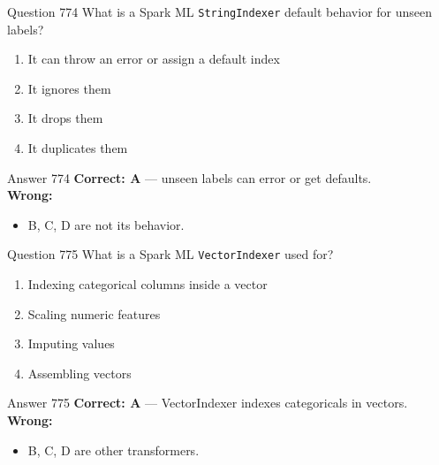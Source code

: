 \documentclass[aspectratio=169,11pt]{beamer}
\begin{document}
	\begin{frame}{Question 774}
		What is a Spark ML \texttt{StringIndexer} default behavior for unseen labels?
		\begin{enumerate}[label=\Alph*.]
			\item It can throw an error or assign a default index
			\item It ignores them
			\item It drops them
			\item It duplicates them
		\end{enumerate}
	\end{frame}
	\begin{frame}{Answer 774}
		\textbf{Correct: A} --- unseen labels can error or get defaults.\\
		\vspace{0.5em}
		\textbf{Wrong:}
		\begin{itemize}
			\item B, C, D are not its behavior.
		\end{itemize}
	\end{frame}
	
	\begin{frame}{Question 775}
		What is a Spark ML \texttt{VectorIndexer} used for?
		\begin{enumerate}[label=\Alph*.]
			\item Indexing categorical columns inside a vector
			\item Scaling numeric features
			\item Imputing values
			\item Assembling vectors
		\end{enumerate}
	\end{frame}
	\begin{frame}{Answer 775}
		\textbf{Correct: A} --- VectorIndexer indexes categoricals in vectors.\\
		\vspace{0.5em}
		\textbf{Wrong:}
		\begin{itemize}
			\item B, C, D are other transformers.
		\end{itemize}
	\end{frame}
	
\end{document}
